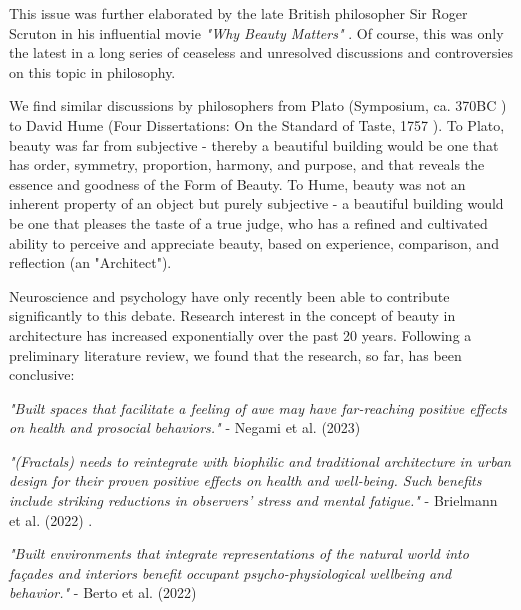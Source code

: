 \documentclass{article}
\begin{document}
\clearpage
\begin{multicols}{2}

This issue was further elaborated by the late British philosopher Sir Roger Scruton in his influential movie \textit{"Why Beauty Matters"} \cite{scruton_why_2009}. Of course, this was only the latest in a long series of ceaseless and unresolved discussions and controversies on this topic in philosophy.

We find similar discussions by philosophers from Plato (Symposium, ca. 370BC \cite{plato_symposium_1795}) to David Hume (Four Dissertations: On the Standard of Taste, 1757 \cite{hume_iv_1757}). To Plato, beauty was far from subjective - thereby a beautiful building would be one that has order, symmetry, proportion, harmony, and purpose, and that reveals the essence and goodness of the Form of Beauty. To Hume, beauty was not an inherent property of an object but purely subjective - a beautiful building would be one that pleases the taste of a true judge, who has a refined and cultivated ability to perceive and appreciate beauty, based on experience, comparison, and reflection (an "Architect").

Neuroscience and psychology have only recently been able to contribute significantly to this debate. Research interest in the concept of beauty in architecture has increased exponentially over the past 20 years. Following a preliminary literature review, we found that the research, so far, has been conclusive:


\textit{"Built spaces that facilitate a feeling of awe may have far-reaching positive effects on health and prosocial behaviors."} - Negami et al. (2023) \cite{negami_how_2023}

\textit{"(Fractals) needs to reintegrate with biophilic and traditional architecture in urban design for their proven positive effects on health and well-being. Such beneﬁts include striking reductions in observers’ stress and mental fatigue."} \newline - Brielmann et al. (2022) \cite{brielmann_what_2022}.

\textit{"Built environments that integrate representations of the natural world into façades and interiors benefit occupant psycho-physiological wellbeing and behavior."} - Berto et al. (2022) \cite{berto_biophilic_2022}


\end{multicols}
\end{document}
